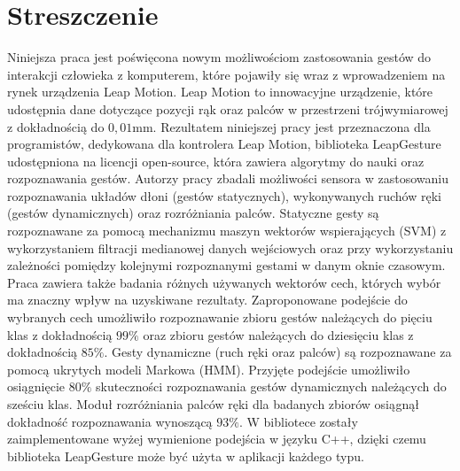 \chapter{Streszczenie}
Niniejsza praca jest poświęcona nowym możliwościom zastosowania gestów do interakcji człowieka z komputerem, które pojawiły się wraz z wprowadzeniem na rynek urządzenia Leap Motion.
Leap Motion to innowacyjne urządzenie, które udostępnia dane dotyczące pozycji rąk oraz palców w przestrzeni trójwymiarowej z dokładnością do $0,01$mm.
Rezultatem niniejszej pracy jest przeznaczona dla programistów, dedykowana dla kontrolera Leap Motion, biblioteka LeapGesture udostępniona na licencji open-source, która zawiera algorytmy do nauki oraz rozpoznawania gestów.
Autorzy pracy zbadali możliwości sensora w zastosowaniu rozpoznawania układów dłoni (gestów statycznych), wykonywanych ruchów ręki (gestów dynamicznych) oraz rozróżniania palców.
Statyczne gesty są rozpoznawane za pomocą mechanizmu maszyn wektorów wspierających (SVM) z wykorzystaniem filtracji medianowej danych wejściowych oraz przy wykorzystaniu zależności pomiędzy kolejnymi rozpoznanymi gestami w danym oknie czasowym.
Praca zawiera także badania różnych używanych wektorów cech, których wybór ma znaczny wpływ na uzyskiwane rezultaty.
Zaproponowane podejście do wybranych cech umożliwiło rozpoznawanie zbioru gestów należących do pięciu klas z dokładnością $99\%$ oraz zbioru gestów należących do dziesięciu klas z dokładnością $85\%$.
Gesty dynamiczne (ruch ręki oraz palców) są rozpoznawane za pomocą ukrytych modeli Markowa (HMM).
Przyjęte podejście umożliwiło osiągnięcie $80\%$ skuteczności rozpoznawania gestów dynamicznych należących do sześciu klas.
Moduł rozróżniania palców ręki dla badanych zbiorów osiągnął dokładność rozpoznawania wynoszącą $93\%$. 
W bibliotece zostały zaimplementowane wyżej wymienione podejścia w języku C++, dzięki czemu biblioteka LeapGesture może być użyta w aplikacji każdego typu.


